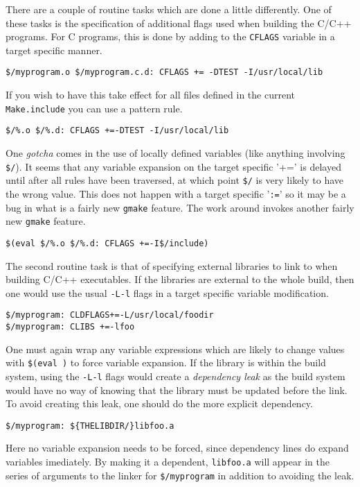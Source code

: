 \documentclass[letterpaper]{article}
\begin{document}
There are a couple of routine tasks which are done a little
differently.  One of these tasks is the specification of additional
flags used when building the C/C++ programs.  For C programs, this is
done by adding to the \verb+CFLAGS+ variable in a target specific
manner.
\begin{verbatim}
$/myprogram.o $/myprogram.c.d: CFLAGS += -DTEST -I/usr/local/lib
\end{verbatim}
If you wish to have this take effect for all files defined in the
current \verb+Make.include+ you can use a pattern rule.
\begin{verbatim}
$/%.o $/%.d: CFLAGS +=-DTEST -I/usr/local/lib
\end{verbatim}
One {\em gotcha} comes in the use of locally defined variables
(like anything involving \verb+$/+).  It seems
that any variable expansion on the target specific '+=' is
delayed until after all rules have been traversed, at which point
\verb+$/+ is very likely to have the wrong value.  This does not
happen with a target specific '\verb+:=+' so it may be a bug in what is
a fairly new \verb+gmake+ feature.  The work around invokes another
fairly new \verb+gmake+ feature.
\begin{verbatim}
$(eval $/%.o $/%.d: CFLAGS +=-I$/include)
\end{verbatim}

The second routine task is that of specifying external libraries to
link to when building C/C++ executables.  If the libraries are
external to the whole build, then one would use the usual \verb+-L-l+
flags in a target specific variable modification.
\begin{verbatim}
$/myprogram: CLDFLAGS+=-L/usr/local/foodir
$/myprogram: CLIBS +=-lfoo
\end{verbatim}
One must again wrap any variable expressions which are likely to change
values with \verb+$(eval )+ to force variable expansion.  If the
library is within the build system, using the \verb+-L-l+ flags would
create a {\em dependency leak} as the build system would have no
way of knowing that the library must be updated before the link.
To avoid creating this leak, one should do the more explicit dependency.
\begin{verbatim}
$/myprogram: ${THELIBDIR/}libfoo.a
\end{verbatim}
Here no variable expansion needs to be forced, since dependency lines
do expand variables imediately.  By making it a dependent, \verb+libfoo.a+
will appear in the series of arguments to the linker for \verb+$/myprogram+
in addition to avoiding the leak.
\end{document}
